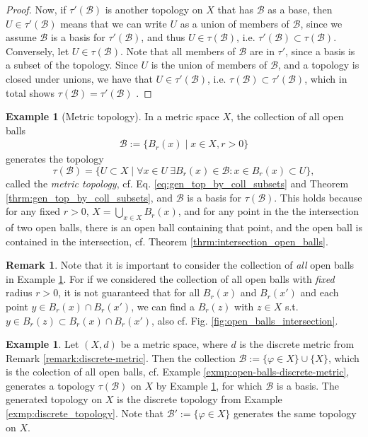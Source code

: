 \documentclass[12pt, a4paper]{article}
\numberwithin{equation}{section}
\theoremstyle{definition}
\theoremstyle{definition}
\newtheorem{exmp}[thm]{Example} %
\newtheorem{remark}[thm]{Remark} %
\begin{document}
\begin{proof}
			Now, if $\tau'(\mathscr B)$ is another topology on $X$ that has $\mathscr B$ as a base, then $U\in\tau'(\mathscr B)$ means that we can write $U$ as a union of members of $\mathscr B$, since we assume $\mathscr B$ is a basis for $\tau'(\mathscr B)$, and thus $U\in \tau(\mathscr B)$, i.e. $\tau'(\mathscr B)\subset \tau(\mathscr B)$. Conversely, let $U\in\tau(\mathscr B)$. Note that all members of $\mathscr B$ are in $\tau'$, since a basis is a subset of the topology. Since $U$ is the union of members of $\mathscr B$, and a topology is closed under unions, we have that $U\in\tau'(\mathscr B)$, i.e. $\tau(\mathscr B)\subset\tau'(\mathscr B)$, which in total shows $\tau(\mathscr B) = \tau'(\mathscr B)$ \cite{713096}.
		\end{proof}
		
		\begin{exmp}[Metric topology]\label{exmp:metric_topology}
			In a metric space $X$, the collection of all open balls 
			\begin{align}\label{eq:bases_open_ball_metric_spaces}
				\mathscr B := \{ B_{r}(x) \mid x\in X, r > 0 \}
			\end{align} 
			generates the topology $$\tau(\mathscr B) = \{U\subset X\mid \forall x\in U\ \exists B_{r}(x)\in\mathscr B: x\in B_{r}(x)\subset U\},$$
			called the \textit{metric topology}, cf. Eq. \eqref{eq:gen_top_by_coll_subsets} and Theorem \ref{thrm:gen_top_by_coll_subsets}, and $\mathscr B$ is a basis for $\tau(\mathscr B)$. This holds because for any fixed $r > 0$, $X = \bigcup_{x\in X}B_{r}(x)$, and for any point in the the intersection of two open balls, there is an open ball containing that point, and the open ball is contained in the intersection, cf. Theorem \ref{thrm:intersection_open_balls}.
		\end{exmp}
		
		\begin{remark}
			Note that it is important to consider the collection of \textit{all} open balls in Example \ref{exmp:metric_topology}. For if we considered the collection of all open balls with \textit{fixed} radius $r > 0$, it is not guaranteed that for all $B_{r}(x)$ and $B_{r}(x')$ and each point $y\in B_{r}(x)\cap B_{r}(x')$, we can find a $B_{r}(z)$ with $z\in X$ s.t. $y\in B_{r}(z)\subset B_{r}(x)\cap B_{r}(x')$, also cf. Fig. \ref{fig:open_balls_intersection}.
		\end{remark}
		
		\begin{exmp}\label{exmp:basis_discrete_metric}
			Let $(X, d)$ be a metric space, where $d$ is the discrete metric from Remark \ref{remark:discrete-metric}. Then the collection $\mathscr B := \{\varphi\in X\}\cup \{X\}$, which is the colection of all open balls, cf. Example \ref{exmp:open-balls-discrete-metric}, generates a topology $\tau(\mathscr B)$ on $X$ by Example \ref{exmp:metric_topology}, for which $\mathscr B$ is a basis. The generated topology on $X$ is the discrete topology from Example \ref{exmp:discrete_topology}. Note that $\mathscr B' := \{\varphi\in X\}$ generates the same topology on $X$.
		\end{exmp}
\end{document}
